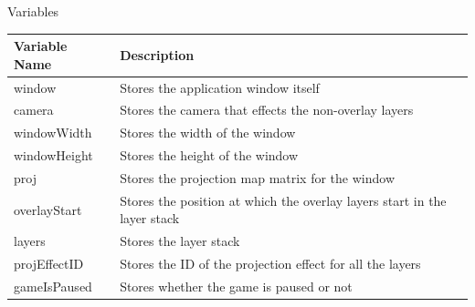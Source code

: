 \documentclass{article}
\begin{document}
                \begin{center}
                    Variables
                    \begin{tabular}{ | m{} | m{} | }
                        \hline
                        \textbf{Variable Name} & \textbf{\textbf{Description}} \\
                        \hline
                        window & Stores the application window itself \\
                        \hline
                        camera & Stores the camera that effects the non-overlay layers \\
                        \hline
                        windowWidth & Stores the width of the window \\
                        \hline
                        windowHeight & Stores the height of the window \\
                        \hline
                        proj & Stores the projection map matrix for the window \\
                        \hline
                        overlayStart & Stores the position at which the overlay layers start in the layer stack \\
                        \hline
                        layers & Stores the layer stack \\
                        \hline
                        projEffectID & Stores the ID of the projection effect for all the layers \\
                        \hline
                        gameIsPaused & Stores whether the game is paused or not \\
                        \hline
                    \end{tabular}


\end{center}
\end{document}
